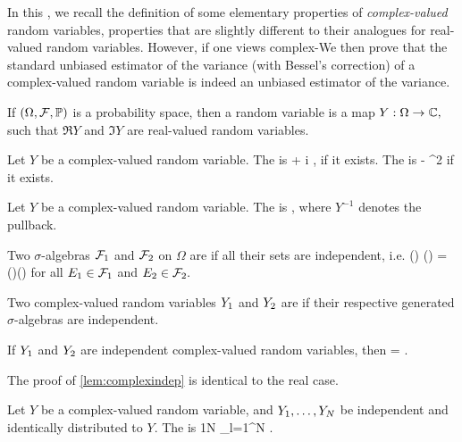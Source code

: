 In this , we recall the definition of some elementary properties of \emph{complex-valued} random variables, properties that are slightly different to their analogues for real-valued random variables. However, if one views complex-We then prove that the standard unbiased estimator of the variance (with Bessel's correction) of a complex-valued random variable  is indeed an unbiased estimator of the variance.

If $\OFP$ is a probability space, then a  random variable is a map $Y:\Omega\rightarrow \mathbb C,$ such that $\Re Y$ and $\Im Y$ are real-valued random variables.
\ede

Let $Y$ be a complex-valued random variable. The  is
\beqs
{} \de {} + i ,
\eeqs
if it exists. The  is
\beqs
{} \de {} - ^2
\eeqs
if it exists.
\ede

Let $Y$ be a complex-valued random variable. The  is
\beqs
{} \de {},
\eeqs
where $Y^{-1}$ denotes the pullback.
\ede

Two $\sigma$-algebras $\mathcal F_{1}$ and $\mathcal F_{2}$ on $\Omega$ are  if all their sets are independent, i.e.
\beqs
\PP\mleft(\Eo\mright) \cap \PP\mleft(\Et\mright) = \PP\mleft(\Eo\mright)\PP\mleft(\Et\mright)
\eeqs
for all $E_{1} \in \mathcal F_{1}$ and $E_{2} \in \mathcal F_{2}.$
\ede

Two complex-valued random variables $Y_{1}$ and $Y_{2}$ are  if their respective generated $\sigma$-algebras are independent.
\ede

\label{lem:complexindep}
If $Y_{1}$ and $Y_{2}$ are independent complex-valued random variables, then
\beqs
\EXP{\Yo\Ytbar} = \EXP{\Yo}\EXP{\Ytbar}.
\eeqs
\ele

The proof of \cref{lem:complexindep} is identical to the real case.

Let $Y$ be a complex-valued random variable, and $Y_{1},\ldots,Y_{N}$ be independent and identically distributed to $Y$. The  is
\beqs
\Yhat \de\frac1N \sum_{l=1}^N \Yl.
\eeqs
\ede

